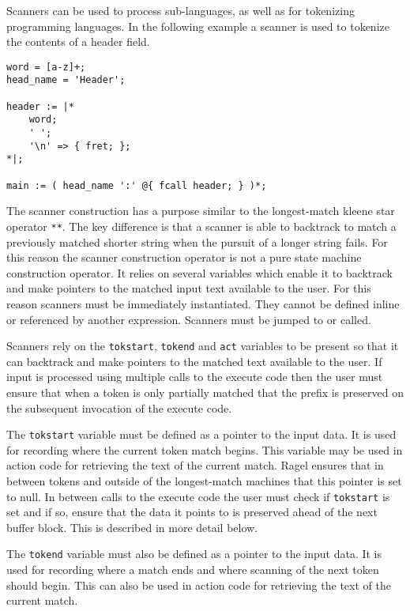 \documentclass[letterpaper,11pt,oneside]{book}
\newcommand{\verbspace}{\vspace{10pt}}
\newenvironment{inline_code}{\def\baselinestretch{1}\vspace{12pt}\small}{}
\begin{document}
Scanners can be used to process sub-languages, as well as for tokenizing
programming languages. In the following example a scanner is used to tokenize
the contents of a header field.

\begin{inline_code}
\begin{verbatim}
word = [a-z]+;
head_name = 'Header';

header := |*
    word;
    ' ';
    '\n' => { fret; };
*|;

main := ( head_name ':' @{ fcall header; } )*;
\end{verbatim}
\end{inline_code}
\verbspace

The scanner construction has a purpose similar to the longest-match kleene star
operator \verb|**|. The key
difference is that a scanner is able to backtrack to match a previously matched
shorter string when the pursuit of a longer string fails.  For this reason the
scanner construction operator is not a pure state machine construction
operator. It relies on several variables which enable it to backtrack and make
pointers to the matched input text available to the user.  For this reason
scanners must be immediately instantiated. They cannot be defined inline or
referenced by another expression. Scanners must be jumped to or called.

Scanners rely on the \verb|tokstart|, \verb|tokend| and \verb|act|
variables to be present so that it can backtrack and make pointers to the
matched text available to the user. If input is processed using multiple calls
to the execute code then the user must ensure that when a token is only
partially matched that the prefix is preserved on the subsequent invocation of
the execute code.

The \verb|tokstart| variable must be defined as a pointer to the input data.
It is used for recording where the current token match begins. This variable
may be used in action code for retrieving the text of the current match.  Ragel
ensures that in between tokens and outside of the longest-match machines that
this pointer is set to null. In between calls to the execute code the user must
check if \verb|tokstart| is set and if so, ensure that the data it points to is
preserved ahead of the next buffer block. This is described in more detail
below.

The \verb|tokend| variable must also be defined as a pointer to the input data.
It is used for recording where a match ends and where scanning of the next
token should begin. This can also be used in action code for retrieving the
text of the current match.
\end{document}
